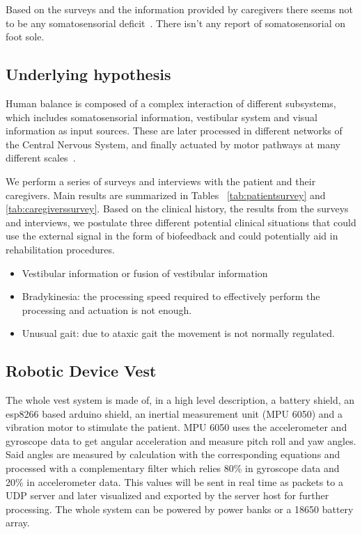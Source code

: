 \documentclass[conference]{IEEEtran}
\begin{document}
Based on the surveys and the information provided by caregivers there seems not to be any somatosensorial deficit~\cite{Donato.etal2016}. 
There isn't any report of somatosensorial on foot sole. 


\subsection{Underlying hypothesis}

Human balance is composed of a complex interaction of different subsystems, which includes somatosensorial information, vestibular system and visual information as input sources.  These are later processed in different networks of the Central Nervous System, and finally actuated by motor pathways at many different scales~\cite{Donato.etal2016}.

We perform a series of surveys and interviews with the patient and their caregivers.  Main results are summarized in 
Tables ~\ref{tab:patientsurvey} and \ref{tab:caregiverssurvey}.  Based on the clinical history, the results from the surveys and interviews, we postulate three different potential clinical situations that could use the external signal in the form of biofeedback and could potentially aid in rehabilitation procedures.


\begin{itemize}
\item Vestibular information or fusion of vestibular information
\item Bradykinesia: the processing speed required to effectively perform the processing and actuation is not enough.
\item Unusual gait: due to ataxic gait the movement is not normally regulated.
\end{itemize}


\subsection{Robotic Device Vest}
The whole vest system is made of, in a high level description, a battery shield, an esp8266 based arduino shield, an inertial measurement unit (MPU 6050) and a vibration motor to stimulate the patient. MPU 6050 uses the accelerometer and gyroscope data to get angular acceleration and measure pitch roll and yaw angles. Said angles are measured by calculation with the corresponding equations and processed with a complementary filter which relies 80\% in gyroscope data and 20\% in accelerometer data. This values will be sent in real time as packets to a UDP server and later visualized and exported by the server host for further processing. The whole system can be powered by power banks or a 18650 battery array.
\end{document}
